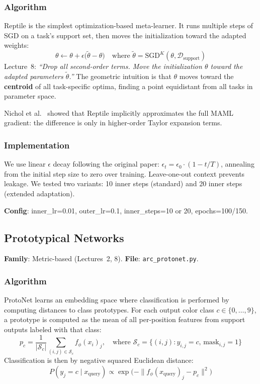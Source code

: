 \documentclass[11pt,a4paper]{article}
\begin{document}
\subsubsection{Algorithm}
Reptile is the simplest optimization-based meta-learner. It runs multiple steps of SGD on a task's support set, then moves the initialization toward the adapted weights:
\begin{equation}
  \boxed{\theta \leftarrow \theta + \epsilon\bigl(\tilde{\theta} - \theta\bigr)} \quad \text{where } \tilde{\theta} = \text{SGD}^K(\theta, \mathcal{D}_{\text{support}})
\end{equation}
Lecture~8: \emph{``Drop all second-order terms. Move the initialization $\theta$ toward the adapted parameters $\tilde{\theta}$.''} The geometric intuition is that $\theta$ moves toward the \textbf{centroid} of all task-specific optima, finding a point equidistant from all tasks in parameter space.

Nichol et al.~\cite{nichol2018} showed that Reptile implicitly approximates the full MAML gradient: the difference is only in higher-order Taylor expansion terms.

\subsubsection{Implementation}
We use linear $\epsilon$ decay following the original paper: $\epsilon_t = \epsilon_0 \cdot (1 - t/T)$, annealing from the initial step size to zero over training. Leave-one-out context prevents leakage. We tested two variants: 10 inner steps (standard) and 20 inner steps (extended adaptation).

\textbf{Config}: inner\_lr=0.01, outer\_lr=0.1, inner\_steps=10 or 20, epochs=100/150.

\subsection{Prototypical Networks~\cite{snell2017}}
\textbf{Family}: Metric-based (Lectures~2, 8). \textbf{File}: \texttt{arc\_protonet.py}.

\subsubsection{Algorithm}
ProtoNet learns an embedding space where classification is performed by computing distances to class prototypes. For each output color class $c \in \{0, \ldots, 9\}$, a prototype is computed as the mean of all per-position features from support outputs labeled with that class:
\begin{equation}
  p_c = \frac{1}{|\mathcal{S}_c|} \sum_{(i,j) \in \mathcal{S}_c} f_\phi(x_i)_j, \quad \text{where } \mathcal{S}_c = \{(i,j) : y_{i,j} = c, \, \text{mask}_{i,j} = 1\}
\end{equation}
Classification is then by negative squared Euclidean distance:
\begin{equation}
  P(y_j = c \mid x_{\text{query}}) \propto \exp\!\bigl(-\|f_\phi(x_{\text{query}})_j - p_c\|^2\bigr)
\end{equation}
\end{document}

